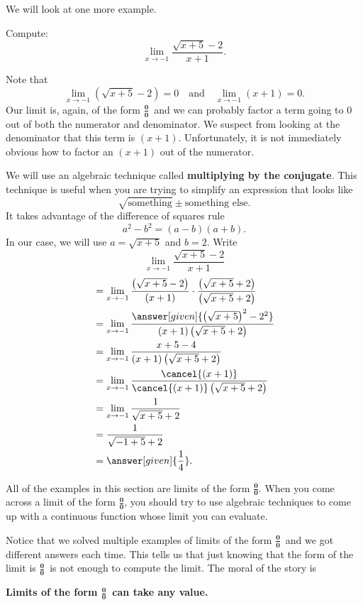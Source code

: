 \documentclass{ximera}
\begin{document}
We will  look at one more example.

\begin{example}
  Compute:
  \[
  \lim_{x\to-1} \frac{\sqrt{x+5}-2}{x+1}.
  \]

\begin{explanation} 
  Note that 
  \[
  \lim_{x\to-1} \left(\sqrt{x+5}-2\right)=0\quad\text{and}\quad\lim_{x\to -1} \left(x+1\right) =0.
  \]
  Our limit is, again, of the form $\boldsymbol{\tfrac{0}{0}}$\ and we
  can probably factor a term going to $0$ out of both the numerator
  and denominator.  We suspect from looking at the denominator that
  this term is $(x+1)$.  Unfortunately, it is not immediately obvious
  how to factor an $(x+1)$ out of the numerator.
 
  We will use an algebraic technique called \textbf{multiplying by the
    conjugate}.  This technique is useful when you are trying to
  simplify an expression that looks like
  \[
  \sqrt{\text{something}} \pm \text{something else}.
  \]
  It takes advantage of the difference of squares rule 
  \[
  a^2-b^2=(a-b)(a+b).
  \]
  In our case, we will use $a=\sqrt{x+5}$ and $b=2$.  Write
  \[
  \lim_{x\to-1} \frac{\sqrt{x+5}-2}{x+1}
  \]
  \begin{align*}
    &= \lim_{x\to-1} \frac{\left(\sqrt{x+5}-2\right)}{(x+1)} \cdot \frac{\left(\sqrt{x+5}+2\right)}{\left(\sqrt{x+5}+2\right)} \\
&=\lim_{x\to-1} \frac{\answer[given]{\left(\sqrt{x+5}\right)^2-2^2}}{(x+1)\left(\sqrt{x+5}+2\right)} \\
&=\lim_{x\to-1} \frac{x+5-4}{(x+1)\left(\sqrt{x+5}+2\right)} \\
&=\lim_{x\to-1} \frac{\cancel{(x+1)}}{\cancel{(x+1)}\left(\sqrt{x+5}+2\right)} \\
&=\lim_{x\to-1} \frac{1}{\sqrt{x+5}+2}\\
&= \frac{1}{\sqrt{-1+5}+2}\\
&=\answer[given]{\frac{1}{4}}.
\end{align*}
\end{explanation}
\end{example}

All of the examples in this section are limits of the form $\boldsymbol{\tfrac{0}{0}}$.
When you come across a limit of the form $\boldsymbol{\tfrac{0}{0}}$, you should try
to use algebraic techniques to come up with a continuous
function whose limit you can evaluate.

Notice that we solved multiple examples of limits of the form
$\boldsymbol{\tfrac{0}{0}}$\ and we got different answers each time.  This tells us
that just knowing that the form of the limit is $\boldsymbol{\tfrac{0}{0}}$\ is not enough
to compute the limit. The moral of the story is
\begin{center}
  \textbf{Limits of the form $\boldsymbol{\tfrac{0}{0}}$\ can take any value.}
\end{center}
\end{document}
